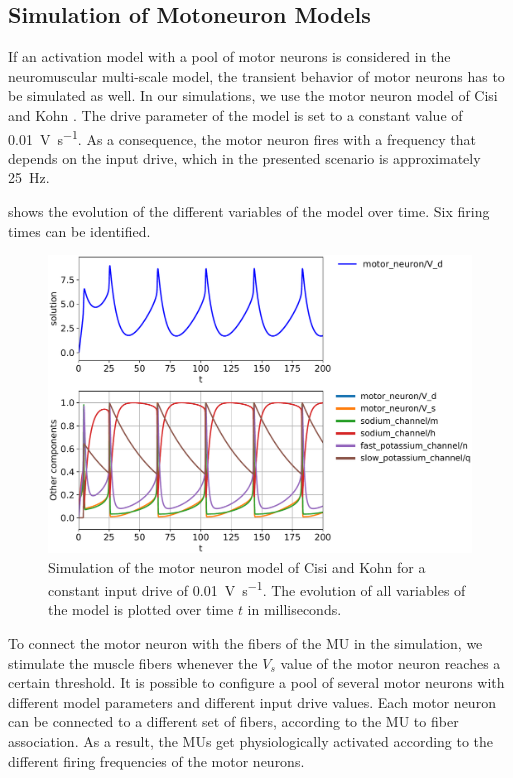 \subsection{Simulation of Motoneuron Models}

If an activation model with a pool of motor neurons is considered in the neuromuscular multi-scale model, the transient behavior of motor neurons has to be simulated as well. In our simulations, we use the motor neuron model of Cisi and Kohn \cite{Cisi2008}. The drive parameter of the model is set to a constant value of \SI{0.01}{\volt\per\second}. As a consequence, the motor neuron fires with a frequency that depends on the input drive, which in the presented scenario is approximately \SI{25}{\hertz}.

 shows the evolution of the different variables of the model over time. Six firing times can be identified. 

\begin{figure}
  \centering%
  \includegraphics[width=\textwidth]{images/results/basic/motoneuron_plot.pdf}%
  \caption{Simulation of the motor neuron model of Cisi and Kohn \cite{Cisi2008} for a constant input drive of  \SI{0.01}{\volt\per\second}. The evolution of all variables of the model is plotted over time $t$ in milliseconds.}%
  \label{fig:motoneuron_plot}%
\end{figure}%

To connect the motor neuron with the fibers of the MU in the simulation, we stimulate the muscle fibers whenever the $V_s$ value of the motor neuron reaches a certain threshold. It is possible to configure a pool of several motor neurons with different model parameters and different input drive values. Each motor neuron can be connected to a different set of fibers, according to the MU to fiber association. As a result, the MUs get physiologically activated according to the different firing frequencies of the motor neurons.

